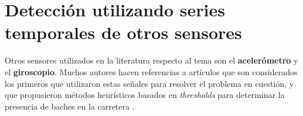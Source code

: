










\section{Detección utilizando series temporales de otros sensores}
	Otros sensores utilizados en la literatura respecto al tema son el \textbf{acelerómetro} y el \textbf{giroscopio}. Muchos
	autores hacen referencias a artículos que son considerados los primeros que utilizaron estas señales para resolver el 
	problema en cuestión, y que propusieron métodos heurísticos basados en \emph{thresholds} para determinar la presencia de
	baches en la carretera .

